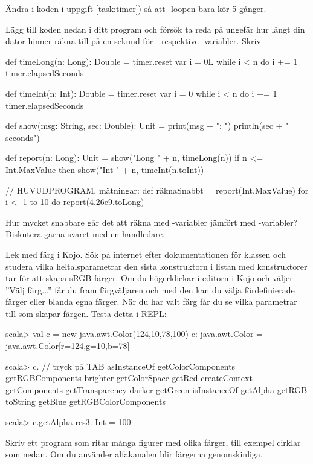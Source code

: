 \Subtask Ändra i koden i uppgift \ref{task:timer}) så att -loopen bara kör 5 gånger. %

\Subtask Lägg till koden nedan i ditt program och försök ta reda på ungefär hur långt din dator hinner räkna till på en sekund för - respektive -variabler. Skriv 
\begin{CodeSmall}
def timeLong(n: Long): Double =
  timer.reset
  var i = 0L
  while i < n do
    i += 1
  timer.elapsedSeconds

def timeInt(n: Int): Double =
  timer.reset
  var i = 0
  while i < n do
    i += 1
  timer.elapsedSeconds

def show(msg: String, sec: Double): Unit =
  print(msg + ": ")
  println(sec + " seconds")

def report(n: Long): Unit =
  show("Long " + n, timeLong(n))
  if n <= Int.MaxValue then
    show("Int  " + n, timeInt(n.toInt))

// HUVUDPROGRAM, mätningar:
def räknaSnabbt =
  report(Int.MaxValue)
  for i <- 1 to 10 do
    report(4.26e9.toLong)
\end{CodeSmall}

\Subtask Hur mycket snabbare går det att räkna med -variabler jämfört med -variabler? Diskutera gärna svaret med en handledare.

\Task Lek med färg i Kojo. Sök på internet efter dokumentationen för klassen  och studera vilka heltalsparametrar den sista konstruktorn i listan med konstruktorer tar för att skapa sRGB-färger. Om du högerklickar i editorn i Kojo och väljer ''Välj färg...'' får du fram färgväljaren och med den kan du välja fördefinierade färger eller blanda egna färger. När du har valt färg får du se vilka parametrar till  som skapar färgen. Testa detta i REPL:

\begin{REPL}
scala> val c = new java.awt.Color(124,10,78,100)
c: java.awt.Color = java.awt.Color[r=124,g=10,b=78]

scala> c.  // tryck på TAB
asInstanceOf    getColorComponents      getRGBComponents
brighter        getColorSpace           getRed
createContext   getComponents           getTransparency
darker          getGreen                isInstanceOf
getAlpha        getRGB                  toString
getBlue         getRGBColorComponents

scala> c.getAlpha
res3: Int = 100
\end{REPL}
Skriv ett program som ritar många figurer med olika färger, till exempel cirklar som nedan. Om du använder alfakanalen blir färgerna genomskinliga.

